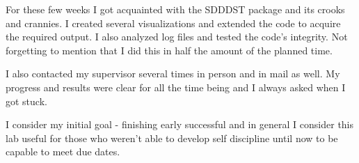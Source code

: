 \documentclass[12pt,a4paper]{article}
\theoremstyle{plain}
\begin{document}
\begin{multicols*}{2}
	\par For these few weeks I got acquainted with the SDDDST package and its crooks and crannies.
	I created several visualizations and extended the code to acquire the required
	output. I also analyzed log files and tested the code's integrity. Not forgetting to mention
	that I did this in half the amount of the planned time.

	\par I also contacted my supervisor several times in person and in mail as well. My progress
	and results were clear for all the time being and I always asked when I got stuck.

	\par I consider my initial goal - finishing early successful and in general I consider this
	lab useful for those who weren't able to develop self discipline until now to
	be capable to meet due dates.

	

	

\end{multicols*}
\end{document}
